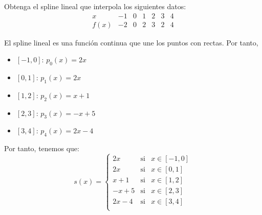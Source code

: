 \begin{ejercicio}
    Obtenga el spline lineal que interpola los siguientes datos:
    \begin{equation*}
        \begin{array}{c|cccccc}
            x & -1 & 0 & 1 & 2 & 3 & 4 \\ \hline
            f(x) & -2 & 0 & 2 & 3 & 2 & 4
        \end{array}
    \end{equation*}

    El spline lineal es una función continua que une los puntos con rectas. Por tanto,
    \begin{itemize}
        \item \underline{$[-1,0]$}: $p_0(x)=2x$
        \item \underline{$[0,1]$}: $p_1(x)=2x$
        \item \underline{$[1,2]$}: $p_2(x)=x+1$
        \item \underline{$[2,3]$}: $p_3(x)=-x+5$
        \item \underline{$[3,4]$}: $p_4(x)=2x-4$
    \end{itemize}

    Por tanto, tenemos que:
    \begin{equation*}
        s(x)=\left\{\begin{array}{lll}
            2x & \text{si} & x\in [-1,0] \\
            2x & \text{si} & x\in [0,1] \\
            x+1 & \text{si} & x\in [1,2] \\
            -x+5 & \text{si} & x\in [2,3] \\
            2x-4 & \text{si} & x\in [3,4] \\
        \end{array}\right.
    \end{equation*}
\end{ejercicio}

